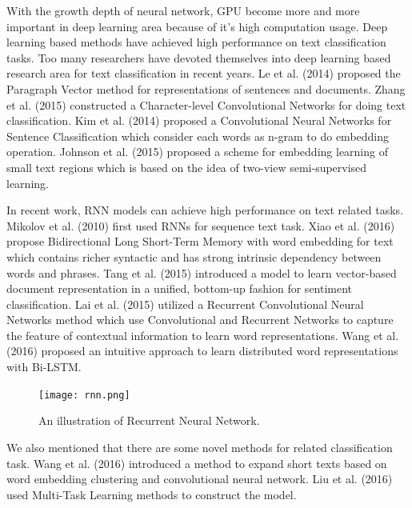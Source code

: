 \documentclass[senior]{IPSstyle}
\begin{document}
With the growth depth of neural network, GPU become more and more important in deep learning area because of it's high computation usage. Deep learning based methods have achieved high performance on text classification tasks. Too many researchers have devoted themselves into  deep learning based research area for text classification  in recent years. Le et al. (2014) \cite{le2014distributed} proposed the Paragraph Vector method for representations of sentences and documents. Zhang et al. (2015) \cite{zhang2015character} constructed a Character-level Convolutional Networks for doing text classification. Kim et al. (2014) \cite{kim2014convolutional} proposed a Convolutional Neural Networks for Sentence Classification which consider each words as n-gram to do embedding operation. Johnson et al. (2015) \cite{johnson2015semi} proposed a scheme for embedding learning of small text regions which is based on the idea of two-view semi-supervised learning.

In recent work, RNN models can achieve high performance on text related tasks. Mikolov et al. (2010) \cite{mikolov2010recurrent} first used RNNs for sequence text task. Xiao et al. (2016) \cite{xiao2016chinese} propose Bidirectional Long Short-Term Memory with word embedding for text which contains richer syntactic and has strong intrinsic dependency between words and phrases. Tang et al. (2015) \cite{tang2015document} introduced a model to learn vector-based document representation in a unified, bottom-up fashion for sentiment classification. Lai et al. (2015) \cite{lai2015recurrent} utilized a Recurrent Convolutional Neural Networks method which use Convolutional and Recurrent Networks to capture the feature of contextual information to learn word representations. Wang
et al. (2016) \cite{wang2016learning} proposed an intuitive approach to learn distributed word representations with Bi-LSTM.


\begin{figure}[t]
  \centering
  \texttt{[image: rnn.png]}\\
  \caption{An illustration of Recurrent Neural Network.}\label{NBde}
\end{figure}


We also mentioned that there are some novel methods for related classification task. Wang et al. (2016) \cite{wang2016semantic} introduced a method to expand short texts based on word embedding clustering and convolutional neural network. Liu et al. (2016) \cite{liu2016recurrent} used Multi-Task Learning methods to construct the model.
\end{document}
